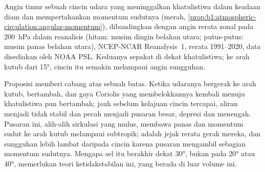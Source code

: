 \begin{omfigure}

{\small Angin timur sebuah cincin udara yang meninggalkan khatulistiwa dalam keadaan diam dan mempertahankan momentum sudutnya (merah, \cref{prop:b1:atmospheric-circulation:angular-momentum}), dibandingkan dengan angin rerata zonal pada \qty{200}{hPa} dalam reanalisis (hitam: musim dingin belahan utara; putus-putus: musim panas belahan utara), NCEP-NCAR Reanalysis~1, rerata 1991--2020, data disediakan oleh NOAA PSL. Keduanya sepakat di dekat khatulistiwa; ke arah kutub dari \ang{15}, cincin itu semakin melampaui angin sungguhan.}
\label{fig:b1:atmospheric-circulation:angular-momentum}
\end{omfigure}

Proposisi memberi cabang atas  sebuah batas. Ketika udaranya bergerak ke arah kutub,  bertambah, dan gaya Coriolis yang membelokkannya kembali menuju khatulistiwa pun bertambah; jauh sebelum kelajuan cincin tercapai, aliran menjadi tidak stabil dan pecah menjadi pusaran besar, depresi dan   menengah. Pusaran ini, alih-alih sirkulasi yang mulus, membawa panas dan momentum sudut ke arah kutub melampaui subtropik;  adalah jejak rerata gerak mereka, dan  sungguhan lebih lambat daripada cincin karena pusaran mengambil sebagian momentum sudutnya. Mengapa sel itu berakhir dekat \ang{30}, bukan pada \ang{20} atau \ang{40}, memerlukan teori ketidakstabilan ini, yang berada di luar volume ini.

